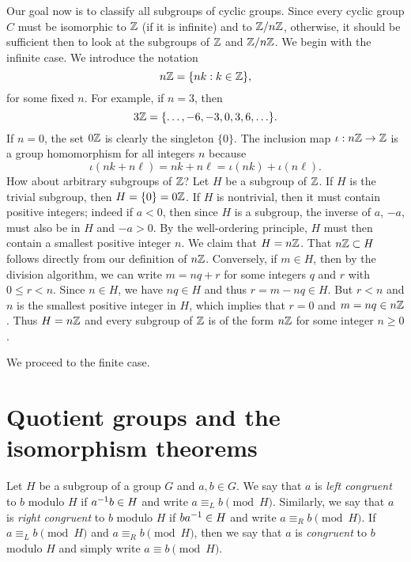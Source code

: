 \begin{example}
    Our goal now is to classify all subgroups of cyclic groups. Since every
    cyclic group \(C\) must be isomorphic to \(\mathbb{Z}\) (if it is infinite) and to
    \(\mathbb{Z}/n\mathbb{Z}\), otherwise, it should be sufficient then to look at the subgroups
    of \(\mathbb{Z}\) and \(\mathbb{Z}/n\mathbb{Z}\). We begin with the infinite case. We introduce the
    notation
    \[
        n\mathbb{Z} = \{nk : k \in \mathbb{Z}\},
    \]
    for some fixed \(n\). For example, if \(n = 3\), then
    \[
        3\mathbb{Z} = \{\ldots, -6, -3, 0, 3, 6, \ldots\}.
    \]
    If \(n = 0\), the set \(0\mathbb{Z}\) is clearly the singleton \(\{0\}\). The
    inclusion map \(\iota: n\mathbb{Z} \to \mathbb{Z}\) is a group homomorphism for all integers
    \(n\) because
    \[
        \iota(nk + n\ell) = nk + n\ell = \iota(nk) + \iota(n\ell).
    \]
    How about arbitrary subgroups of \(\mathbb{Z}\)? Let \(H\) be a subgroup of \(\mathbb{Z}\).
    If \(H\) is the trivial subgroup, then \(H = \{0\} = 0\mathbb{Z}\). If \(H\) is
    nontrivial, then it must contain positive integers; indeed if \(a < 0\),
    then since \(H\) is a subgroup, the inverse of \(a\), \(-a\), must also be
    in \(H\) and \(-a > 0\). By the well-ordering principle, \(H\) must then
    contain a smallest positive integer \(n\). We claim that \(H = n\mathbb{Z}\). That
    \(n\mathbb{Z} \subset H\) follows directly from our definition of \(n\mathbb{Z}\).
    Conversely, if \(m \in H\), then by the division algorithm, we can write \(m
    = nq + r\) for some integers \(q\) and \(r\) with \(0 \leq r < n\). Since
    \(n \in H\), we have \(nq \in H\) and thus \(r = m - nq \in H\). But \(r <
    n\) and \(n\) is the smallest positive integer in \(H\), which implies that
    \(r = 0\) and \(m = nq \in n\mathbb{Z}\). Thus \(H = n\mathbb{Z}\) and every subgroup of
    \(\mathbb{Z}\) is of the form \(n\mathbb{Z}\) for some integer \(n \geq 0\).

    We proceed to the finite case.

\end{example}

\section{Quotient groups and the isomorphism theorems}
\label{sec:quotient-groups}

\begin{definition}
    Let \(H\) be a subgroup of a group \(G\) and \(a, b \in G\). We say that
    \(a\) is \emph{left congruent} to \(b\) modulo \(H\) if \(a^{-1} b \in H\)
    and write \(a \equiv_L b \pmod{H}\). Similarly, we say that \(a\) is
    \emph{right congruent} to \(b\) modulo \(H\) if \(ba^{-1} \in H\) and write
    \(a \equiv_R b \pmod{H}\). If \(a \equiv_L b \pmod{H}\) and \(a \equiv_R b
    \pmod{H}\), then we say that \(a\) is \emph{congruent} to \(b\) modulo \(H\)
    and simply write \(a \equiv b \pmod{H}\).
\end{definition}

